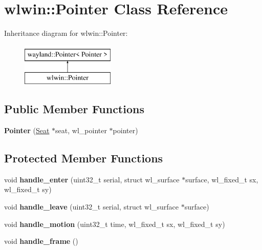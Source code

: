 \hypertarget{classwlwin_1_1Pointer}{}\section{wlwin\+::Pointer Class Reference}
\label{classwlwin_1_1Pointer}
Inheritance diagram for wlwin\+::Pointer\+:\begin{figure}[H]
\begin{center}
\leavevmode
\includegraphics[height=2.000000cm]{classwlwin_1_1Pointer}
\end{center}
\end{figure}
\subsection*{Public Member Functions}
\begin{DoxyCompactItemize}
\item 
\mbox{\label{classwlwin_1_1Pointer_a456c2af2a5d2bf4fa685139be3e06b7f}} 
{\bfseries Pointer} (\mbox{\hyperlink{classwlwin_1_1Seat}{Seat}} $\ast$seat, wl\+\_\+pointer $\ast$pointer)
\end{DoxyCompactItemize}
\subsection*{Protected Member Functions}
\begin{DoxyCompactItemize}
\item 
\mbox{\label{classwlwin_1_1Pointer_abf4a4475a2837262fb9bd5d22bcda2c6}} 
void {\bfseries handle\+\_\+enter} (uint32\+\_\+t serial, struct wl\+\_\+surface $\ast$surface, wl\+\_\+fixed\+\_\+t sx, wl\+\_\+fixed\+\_\+t sy)
\item 
\mbox{\label{classwlwin_1_1Pointer_a8ef2493103a9bc2ef24de798da51c727}} 
void {\bfseries handle\+\_\+leave} (uint32\+\_\+t serial, struct wl\+\_\+surface $\ast$surface)
\item 
\mbox{\label{classwlwin_1_1Pointer_a13a7e2503fa2e2a95ec955ec362035bf}} 
void {\bfseries handle\+\_\+motion} (uint32\+\_\+t time, wl\+\_\+fixed\+\_\+t sx, wl\+\_\+fixed\+\_\+t sy)
\item 
\mbox{\label{classwlwin_1_1Pointer_ad91ae93d9efe9496480c139f96951708}} 
void {\bfseries handle\+\_\+frame} ()
\end{DoxyCompactItemize}
